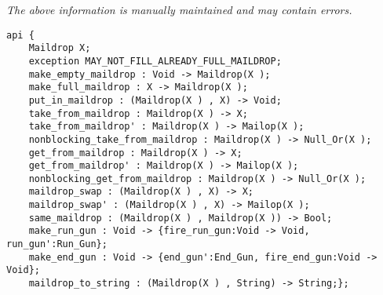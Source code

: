 \label{api:Maildrop}

{\tiny \it The above information is manually maintained and may contain errors.}
\begin{verbatim}
api {
    Maildrop X;
    exception MAY_NOT_FILL_ALREADY_FULL_MAILDROP;
    make_empty_maildrop : Void -> Maildrop(X );
    make_full_maildrop : X -> Maildrop(X );
    put_in_maildrop : (Maildrop(X ) , X) -> Void;
    take_from_maildrop : Maildrop(X ) -> X;
    take_from_maildrop' : Maildrop(X ) -> Mailop(X );
    nonblocking_take_from_maildrop : Maildrop(X ) -> Null_Or(X );
    get_from_maildrop : Maildrop(X ) -> X;
    get_from_maildrop' : Maildrop(X ) -> Mailop(X );
    nonblocking_get_from_maildrop : Maildrop(X ) -> Null_Or(X );
    maildrop_swap : (Maildrop(X ) , X) -> X;
    maildrop_swap' : (Maildrop(X ) , X) -> Mailop(X );
    same_maildrop : (Maildrop(X ) , Maildrop(X )) -> Bool;
    make_run_gun : Void -> {fire_run_gun:Void -> Void, run_gun':Run_Gun};
    make_end_gun : Void -> {end_gun':End_Gun, fire_end_gun:Void -> Void};
    maildrop_to_string : (Maildrop(X ) , String) -> String;};
\end{verbatim}
